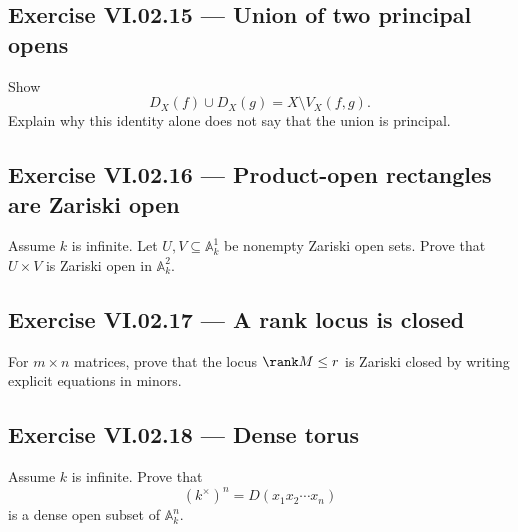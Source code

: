 \subsection*{Exercise VI.02.15 --- Union of two principal opens}
\label{ex:vi02-15}
Show
\[
D_X(f)\cup D_X(g)=X\setminus V_X(f,g).
\]
Explain why this identity alone does not say that the union is principal.

\subsection*{Exercise VI.02.16 --- Product-open rectangles are Zariski open}
\label{ex:vi02-16}
Assume \(k\) is infinite.  Let \(U,V\subseteq\mathbb A_k^1\) be nonempty Zariski open
sets.  Prove that \(U\times V\) is Zariski open in \(\mathbb A_k^2\).

\subsection*{Exercise VI.02.17 --- A rank locus is closed}
\label{ex:vi02-17}
For \(m\times n\) matrices, prove that the locus \(\rank M\le r\) is Zariski closed by
writing explicit equations in minors.

\subsection*{Exercise VI.02.18 --- Dense torus}
\label{ex:vi02-18}
Assume \(k\) is infinite.  Prove that
\[
(k^\times)^n=D(x_1x_2\cdots x_n)
\]
is a dense open subset of \(\mathbb A_k^n\).
